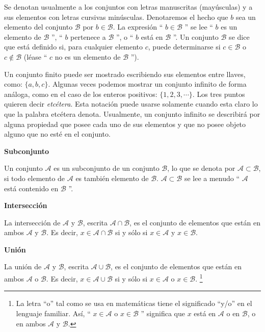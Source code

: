 		Se denotan usualmente a los conjuntos con letras manuscritas (mayúsculas) y a sus elementos con letras cursivas minúsculas. Denotaremos el hecho que $b$ sea un elemento del conjunto $\mathcal{B}$ por $b\in \mathcal{B}$. La expresión `` $b \in \mathcal{B}$ '' se lee `` $b$ es un elemento de $\mathcal{B}$ '', `` $b$ pertenece a $\mathcal{B}$ '', o `` $b$ está en $\mathcal{B}$ ''. Un conjunto $\mathcal{B}$ se dice que está definido si, para cualquier elemento $c$, puede determinarse si $c \in \mathcal{B}$ o $c \not\in \mathcal{B}$ (léase `` $c$ no es un elemento de $\mathcal{B}$ '').
		
		Un conjunto finito puede ser mostrado escribiendo sus elementos entre llaves, como: $\{a, b, c\}$. Algunas veces podemos mostrar un conjunto infinito de forma análoga, como en el caso de los enteros positivos: $\{1, 2, 3, \cdots \}$. Los tres puntos quieren decir \textit{etcétera}. Esta notación puede usarse solamente cuando esta claro lo que la palabra etcétera denota. Usualmente, un conjunto infinito se describirá por alguna propiedad que posee cada uno de sus elementos y que no posee objeto alguno que no esté en el conjunto.
		
\vspace{0.21cm}
\begin{tcolorbox}
	\begin{defi}\textbf{Subconjunto}\end{defi}
	Un conjunto $\mathcal{A}$ es un subconjunto de un conjunto $\mathcal{B}$, lo que se denota por $\mathcal{A} \subset \mathcal{B}$, si todo elemento de $\mathcal{A}$ es también elemento de $\mathcal{B}$. $\mathcal{A} \subset \mathcal{B}$ se lee a menudo `` $\mathcal{A}$ está contenido en $\mathcal{B}$ ''.
\end{tcolorbox}

\vspace{0.21cm}
\begin{tcolorbox}
	\begin{defi}\textbf{Intersección}\end{defi}
	La intersección de $\mathcal{A}$ y $\mathcal{B}$, escrita $\mathcal{A} \cap \mathcal{B}$, es el conjunto de elementos que están en ambos $\mathcal{A}$ y $\mathcal{B}$. Es decir, $x \in \mathcal{A} \cap \mathcal{B}$ si y sólo si $x\in \mathcal{A}$ y $x\in \mathcal{B}$.
\end{tcolorbox}

\vspace{0.21cm}
\begin{tcolorbox}
	\begin{defi}\textbf{Unión}\end{defi}
	La unión de $\mathcal{A}$ y $\mathcal{B}$, escrita $\mathcal{A} \cup \mathcal{B}$, es el conjunto de elementos que están en ambos $\mathcal{A}$ o $\mathcal{B}$. Es decir, $x \in \mathcal{A} \cup \mathcal{B}$ si y sólo si $x\in \mathcal{A}$ o $x\in \mathcal{B}$. \footnote{La letra ``o'' tal como se usa en matemáticas tiene el significado ``y/o'' en el lenguaje familiar. Así, `` $x\in \mathcal{A}$ o $x\in \mathcal{B}$ '' significa que $x$ está en $\mathcal{A}$ o en $\mathcal{B}$, o en ambos $\mathcal{A}$ y $\mathcal{B}$.}
\end{tcolorbox}
	
